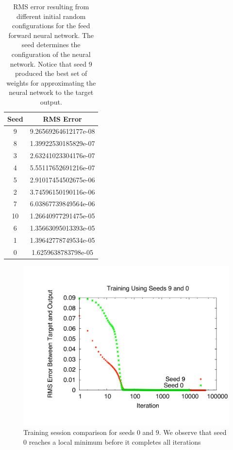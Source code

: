 \documentclass[11pt]{article}
\begin{document}
\begin{table}
	\begin{center}
		\begin{tabular}{|c|c|}
		\hline
		Seed & RMS Error\\
		\hline
		9 & 9.26569264612177e-08\\
		8 & 1.39922530185829e-07\\
		3 & 2.63241023304176e-07\\
		4 & 5.55117652691216e-07\\
		5 & 2.91017454502675e-06\\
		2 & 3.74596150190116e-06\\
		7 & 6.03867739849564e-06\\
		10 & 1.26640977291475e-05\\
		6 & 1.35663095013393e-05\\
		1 & 1.39642778749534e-05\\
		0 & 1.6259638783798e-05\\
		\hline
		\end{tabular}	\end{center}
	\caption{RMS error resulting from different initial random configurations for the feed forward neural network. The seed determines the configuration of the neural network. Notice that seed $9$ produced the best set of weights for approximating the neural network to the target output.}
	\label{tab:training_seeds}
\end{table}

\begin{figure}[htbp]
	\centering
		\includegraphics[width=0.85\columnwidth]{../bpgt-3.0/damping_test/Trainings.pdf}
	\caption{Training session comparison for seeds $0$ and $9$. We observe that seed $0$ reaches a local minimum before it completes all iterations}
	\label{fig:bpgt-3.0_damping_test_Trainings}
\end{figure}
\end{document}
